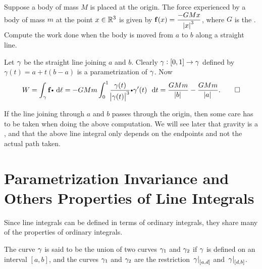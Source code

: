   \begin{exa}
    Suppose a body of mass $M$ is placed at the origin.
    The force experienced by a body of mass $m$ at the point $x \in \mathbb{R}^3$ is given by $\mathbf{ f}(x) = \dfrac{ -GM x}{\abs{x}^3}$, where $G$ is the .
    Compute the work done when the body is moved from $a$ to $b$ along a straight line.
  \end{exa}
  \begin{solu}
    Let $\gamma$ be the straight line joining $a$ and $b$.
    Clearly $\gamma:[0,1] \to \gamma$ defined by $\gamma(t) = a + t(b-a)$ is a parametrization of $\gamma$.
    Now
    \begin{equation*}
      W
	= \dint_\caminho \funvect{f} \bp \, \dif \ell
	= -GMm \dint_0^1 \dfrac{\gamma(t)}{\abs{\gamma(t)}^3} \bp \gamma'(t) \, \dt
	= \dfrac{GMm}{\abs{b}} - \dfrac{GMm}{\abs{a}}.
	\qed
    \end{equation*}
  \end{solu}
  \begin{remark}
    If the line joining through $a$ and $b$ passes through the origin, then some care has to be taken when doing the above computation.
    We will see later that gravity is a , and that the above line integral only depends on the endpoints and not the actual path taken.
  \end{remark}


  
  
  \section{Parametrization Invariance and Others Properties of Line Integrals}
  
Since line integrals can be defined in terms of ordinary integrals, they share many of the properties of ordinary integrals. 

\begin{df}

The curve $\gamma$  is said to be the union of two curves $\gamma_1$ and $\gamma_2$  if $\gamma$
is defined on an interval $[a, b]$, and the curves $\gamma_1$ and $\gamma_2$ are the restriction $\left.\gamma\right|_{[a,d]}$ and $\left.\gamma\right|_{[d,b]}$.
 
\end{df}

